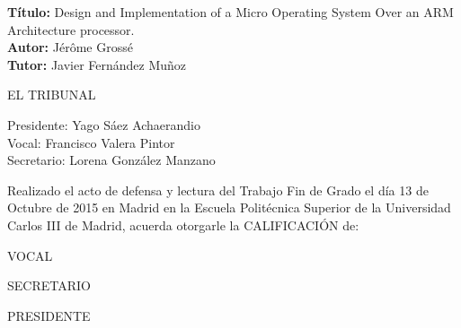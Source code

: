 \cleardoublepage
\pagestyle{empty}
\begin{flushleft} \large
\textbf{Título:} Design and Implementation of a Micro Operating System Over an ARM Architecture processor. \\
\textbf{Autor:} Jérôme Grossé\\
\textbf{Tutor:} Javier Fernández Muñoz\\ [1 cm]

\end{flushleft} 

\begin{center} \LARGE
EL TRIBUNAL \\ [1 cm]
\end{center}

\begin{flushleft} \LARGE
Presidente: Yago Sáez Achaerandio \\ [1 cm]
Vocal: Francisco Valera Pintor\\ [1 cm]
Secretario: Lorena González Manzano\\ [1.5 cm]
\end{flushleft}

\large
Realizado el acto de defensa y lectura del Trabajo Fin de Grado el día 13 de Octubre de 2015 en Madrid en la Escuela Politécnica Superior de la Universidad Carlos III de Madrid, acuerda otorgarle la CALIFICACIÓN de: \\ [2 cm]

\begin{center}
 \large VOCAL \\ [2.2 cm]
\end{center}

\begin{minipage}{0.5\textwidth}
 \begin{flushleft}
 \large SECRETARIO
\end{flushleft}
\end{minipage}
\begin{minipage}{0.5\textwidth}
\begin{flushright}
 \large PRESIDENTE
\end{flushright} 
\end{minipage}
